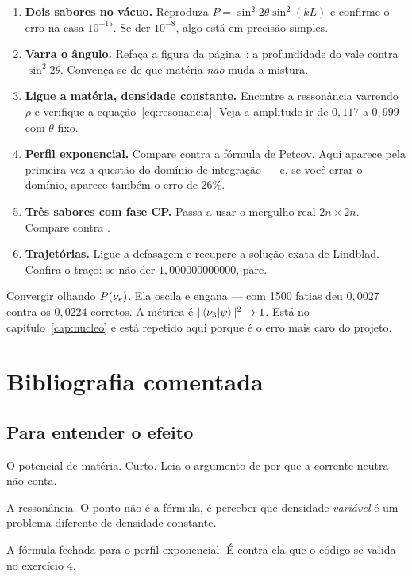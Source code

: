 \begin{enumerate}
\item \textbf{Dois sabores no vácuo.} Reproduza
  $P = \sin^2 2\theta \sin^2(kL)$ e confirme o erro na casa $10^{-15}$. Se der
  $10^{-8}$, algo está em precisão simples.

\item \textbf{Varra o ângulo.} Refaça a figura da página~\pageref{cap:teoria}:
  a profundidade do vale contra $\sin^2 2\theta$. Convença-se de que matéria
  \emph{não} muda a mistura.

\item \textbf{Ligue a matéria, densidade constante.} Encontre a ressonância
  varrendo $\rho$ e verifique a equação~\eqref{eq:resonancia}. Veja a amplitude
  ir de $0{,}117$ a $0{,}999$ com $\theta$ fixo.

\item \textbf{Perfil exponencial.} Compare contra a fórmula de Petcov. Aqui
  aparece pela primeira vez a questão do domínio de integração --- e, se você
  errar o domínio, aparece também o erro de 26\%.

\item \textbf{Três sabores com fase CP.} Passa a usar o mergulho real
  $2n\times2n$. Compare contra .

\item \textbf{Trajetórias.} Ligue a defasagem e recupere a solução exata de
  Lindblad. Confira o traço: se não der $1{,}000000000000$, pare.
\end{enumerate}

\begin{alerta}
Convergir olhando $P(\nu_e)$. Ela oscila e engana --- com 1500 fatias deu
$0{,}0027$ contra os $0{,}0224$ corretos. A métrica é
$|\left\langle\nu_3\middle|\psi\right\rangle|^2 \to 1$. Está no capítulo~\ref{cap:nucleo} e está
repetido aqui porque é o erro mais caro do projeto.
\end{alerta}

\section{Bibliografia comentada}

\subsection{Para entender o efeito}

\begin{description}[leftmargin=0pt, itemsep=0.7ex]
\item[Wolfenstein, 1978.] O potencial de matéria. Curto. Leia o argumento de
  por que a corrente neutra não conta.
\item[Mikheyev \& Smirnov, 1985.] A ressonância. O ponto não é a fórmula, é
  perceber que densidade \emph{variável} é um problema diferente de densidade
  constante.
\item[Petcov, 1988; Kuo \& Pantaleone, 1989.] A fórmula fechada para o perfil
  exponencial. É contra ela que o código se valida no exercício 4.
\end{description}

